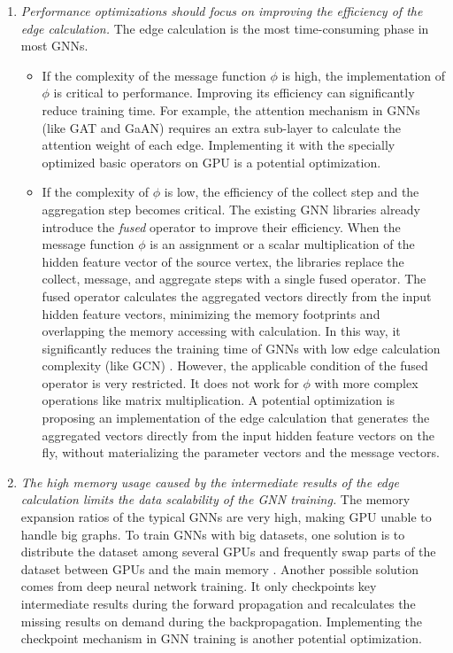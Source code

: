 \begin{enumerate}
    \item \emph{Performance optimizations should focus on improving the efficiency of the edge calculation.}
          The edge calculation is the most time-consuming phase in most GNNs.
          \begin{itemize}
              \item If the complexity of the message function $\phi$ is high, the implementation of $\phi$ is critical to performance.
                    Improving its efficiency can significantly reduce training time.
                    For example, the attention mechanism in GNNs (like GAT and GaAN) requires an extra sub-layer to calculate the attention weight of each edge.
                    Implementing it with the specially optimized basic operators on GPU is a potential optimization.
              \item If the complexity of $\phi$ is low, the efficiency of the collect step and the aggregation step becomes critical.
                    The existing GNN libraries \cite{DGL, PyG, ma2019_neugraph} already introduce the \emph{fused} operator to improve their efficiency.
                    When the message function $\phi$ is an assignment or a scalar multiplication of the hidden feature vector of the source vertex, the libraries replace the collect, message, and aggregate steps with a single fused operator.
                    The fused operator calculates the aggregated vectors directly from the input hidden feature vectors, minimizing the memory footprints and overlapping the memory accessing with calculation.
                    In this way, it significantly reduces the training time of GNNs with low edge calculation complexity (like GCN) \cite{yan2020_characterizing_gcn, zhang2020_analysis_neugraph}.
                    However, the applicable condition of the fused operator is very restricted.
                    It does not work for $\phi$ with more complex operations like matrix multiplication.
                    A potential optimization is proposing an implementation of the edge calculation that generates the aggregated vectors directly from the input hidden feature vectors on the fly, without materializing the parameter vectors and the message vectors.
          \end{itemize}
    \item \emph{The high memory usage caused by the intermediate results of the edge calculation limits the data scalability of the GNN training.}
          The memory expansion ratios of the typical GNNs are very high, making GPU unable to handle big graphs.
          To train GNNs with big datasets, one solution is to distribute the dataset among several GPUs and frequently swap parts of the dataset between GPUs and the main memory \cite{ma2019_neugraph}.
          Another possible solution \cite{chen2016_training_deep} comes from deep neural network training.
          It only checkpoints key intermediate results during the forward propagation and recalculates the missing results on demand during the backpropagation.
          Implementing the checkpoint mechanism in GNN training is another potential optimization.


\end{enumerate}
